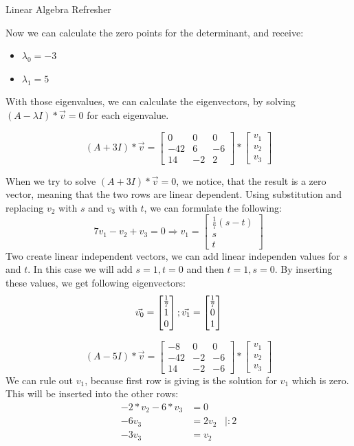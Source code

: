\documentclass[
	english,
        solution=true
	]{tudaexercise}
\begin{document}
\begin{task}[points=28]{Linear Algebra Refresher}
\begin{subtask} [points=5,title=Matrix Decomposition]
\begin{solution}
Now we can calculate the zero points for the determinant, and receive:
\begin{itemize}
    \item $\lambda_0=-3$
    \item $\lambda_1=5$
\end{itemize}

With those eigenvalues, we can calculate the eigenvectors, by solving $(A-\lambda I)*\vec{v}=0$ for each eigenvalue.

\[(A+3I)*\vec{v} = \begin{bmatrix}
        0 & 0 & 0 \\ -42 & 6 & -6 \\ 14 & -2 & 2
    \end{bmatrix}*\begin{bmatrix}
        v_1 \\v_2 \\v_3
    \end{bmatrix}\]

    When we try to solve $(A+3I)*\vec{v}=0$, we notice, that the result is a zero vector, meaning that the two rows are linear dependent.
    Using substitution and replacing $v_2$ with $s$ and $v_3$ with $t$, we can formulate the following:
    \[7v_1-v_2+v_3=0 \Rightarrow v_1=\begin{bmatrix}
        \frac{1}{7}(s-t) \\ s \\ t
    \end{bmatrix}\]
    Two create linear independent vectors, we can add linear independen values for $s$ and $t$. In this case we will add $s=1, t=0$ and then $t=1, s=0$. By inserting these values, we get following eigenvectors:
    \[\vec{v_0}=\begin{bmatrix}
        \frac{1}{7} \\ 1 \\ 0
    \end{bmatrix}; \vec{v_1}=\begin{bmatrix}
        \-\frac{1}{7} \\ 0 \\ 1
    \end{bmatrix}\]

\[(A-5I)*\vec{v}=\begin{bmatrix}
        -8 & 0 & 0 \\ -42 & -2 & -6 \\ 14 & -2 & -6
    \end{bmatrix}*\begin{bmatrix}
        v_1 \\v_2 \\v_3
    \end{bmatrix}\]
    We can rule out $v_1$, because first row is giving is the solution for $v_1$ which is zero. This will be inserted into the other rows:
    \begin{align*}
        -2*v_2-6*v_3 &= 0\\
        -6v_3&=2v_2 \,\,\,\,\, | :2 \\
        -3v_3&=v_2
    \end{align*}


\end{solution}
\end{subtask}
\end{task}
\end{document}
